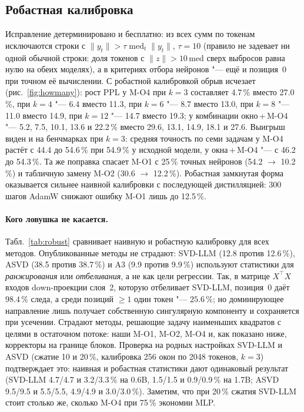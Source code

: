\begin{table}[t]
\centering
\scriptsize
\setlength{\tabcolsep}{3pt}
\caption{Нейроны стока в слое $k_{\mathrm{sink}}-1$ и абляции (8 окон по
1024 токена): удаление во всех позициях, только при $t\ge1$ (позиция~0
точно) и такого же числа случайных нейронов.}
\label{tab:sink}
\end{table}

\subsection{Робастная калибровка}

Исправление детерминировано и бесплатно: из всех сумм по токенам
исключаются строки с $\|y_t\| > \tau \operatorname{med}_t \|y_t\|$,
$\tau = 10$ (правило не задевает ни одной обычной строки: доля токенов с
$\|z\|>10\,\mathrm{med}$ сверх выбросов равна нулю на обеих моделях), а в
критериях отбора нейронов "--- ещё и позиция~0 при точном её вычислении.
С робастной калибровкой обрыв исчезает (рис.~\ref{fig:howmany}): рост
PPL у M-O4 при $k=3$ составляет 4.7\,\% вместо 27.0\,\%, при $k=4$ "---
6.4 вместо 11.3, при $k=6$ "--- 8.7 вместо 13.0, при $k=8$ "--- 11.0 вместо
14.9, при $k=12$ "--- 14.7 вместо 19.3; у комбинации окно\,+\,M-O4 "--- 5.2,
7.5, 10.1, 13.6 и 22.2\,\% вместо 29.6, 13.1, 14.9, 18.1 и 27.6. Выигрыш
виден и на бенчмарках при $k=3$: средняя точность по семи задачам у
M-O4 растёт с 44.4 до 54.6\,\% при 54.9\,\% у исходной модели, у
окна\,+\,M-O4 "--- с 46.2 до 54.3\,\%. Та же поправка спасает M-O1 с
25\,\% точных нейронов (54.2 $\to$ 10.2\,\%) и табличную замену M-O2
(30.6 $\to$ 12.2\,\%). Робастная замкнутая форма оказывается сильнее
наивной калибровки с последующей дистилляцией: 300 шагов AdamW снижают
ошибку M-O1 лишь до 12.5\,\%.

\paragraph{Кого ловушка не касается.} Табл.~\ref{tab:robust} сравнивает
наивную и робастную калибровку для всех методов. Опубликованные методы
не страдают: SVD-LLM (12.8 против 12.6\,\%), ASVD (38.5 против 38.7\,\%)
и A3 (9.9 против 9.9\,\%) используют статистики для \emph{ранжирования}
или \emph{отбеливания}, а не как цели регрессии. Так, в матрице
$X^\top X$ входов down-проекции слоя~2, которую отбеливает SVD-LLM,
позиция~0 даёт $98.4\,\%$ следа, а среди позиций $\ge1$ один токен "---
$25.6\,\%$; но доминирующее направление лишь получает собственную
сингулярную компоненту и сохраняется при усечении. Страдают методы,
решающие задачу наименьших квадратов с целями в остаточном потоке: наши
M-O1, M-O2, M-O4 и, как показано ниже, корректоры на границе блоков.
Проверка на родных настройках SVD-LLM и ASVD (сжатие 10 и 20\,\%,
калибровка 256 окон по 2048 токенов, $k=3$) подтверждает это: наивная и
робастная статистики дают одинаковый результат (SVD-LLM 4.7/4.7 и
3.2/3.3\,\% на 0.6B, 1.5/1.5 и 0.9/0.9\,\% на 1.7B; ASVD 9.5/9.5 и 5.5/5.5,
4.9/4.9 и 3.0/3.0\,\%). Заметим, что при 20\,\% сжатия SVD-LLM стоит
столько же, сколько M-O4 при 75\,\% экономии MLP.

